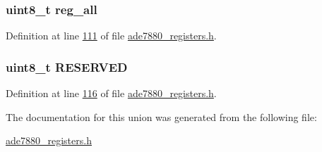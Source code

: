 \hypertarget{a00022_ab2957613fa7f241407cc98e80676dccf}{
\subsubsection[{reg\-\_\-all}]{\setlength{\rightskip}{0pt plus 5cm}uint8\-\_\-t reg\-\_\-all}}\label{d7/de0/a00022_ab2957613fa7f241407cc98e80676dccf}


Definition at line \hyperlink{a00036_source_l00111}{111} of file \hyperlink{a00036_source}{ade7880\-\_\-registers.\-h}.

\hypertarget{a00022_ad5d4752b467b6c64a9b5fa14d65c71b2}{
\subsubsection[{R\-E\-S\-E\-R\-V\-E\-D}]{\setlength{\rightskip}{0pt plus 5cm}uint8\-\_\-t R\-E\-S\-E\-R\-V\-E\-D}}\label{d7/de0/a00022_ad5d4752b467b6c64a9b5fa14d65c71b2}


Definition at line \hyperlink{a00036_source_l00116}{116} of file \hyperlink{a00036_source}{ade7880\-\_\-registers.\-h}.



The documentation for this union was generated from the following file\-:\begin{DoxyCompactItemize}
\item 
\hyperlink{a00036}{ade7880\-\_\-registers.\-h}\end{DoxyCompactItemize}
